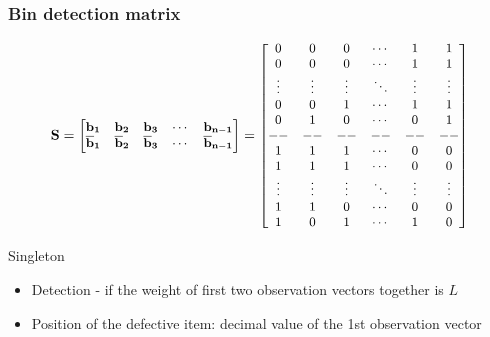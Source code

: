 \begin{frame}\frametitle{Bin detection matrix}
\begin{align*}
{
\small
\mathbf{S}=\begin{bmatrix}
					\bf{b_1} & \bf{b_2} & \bf{b_3} & \cdots & \bf{b_{n-1}}\\
					\vspace{0.2pt}
				   	\bf{\overline{b}_1} & \bf{\overline{b}_2} & \bf{\overline{b}_3} & \cdots & \bf{\overline{b}_{n-1}} \end{bmatrix}
=
 \begin{bmatrix}
		0      & 0   & 0 & \cdots & 1 &  1 \\
		0      & 0   & 0 & \cdots & 1 &  1  \\
		\vdots & \vdots & \vdots & \ddots & \vdots & \vdots \\
		0      & 0   & 1 & \cdots & 1 &  1  \\
		0      & 1   & 0 & \cdots & 0 &  1  \\
		-- & -- & -- & -- & -- & --  \\
        1      & 1   & 1 & \cdots & 0 &  0 \\
		1      & 1   & 1 & \cdots & 0 &  0  \\
		\vdots & \vdots & \vdots & \ddots & \vdots & \vdots \\
		1      & 1   & 0 & \cdots & 0 &  0  \\
		1      & 0   & 1 & \cdots & 1 &  0  \\
\end{bmatrix}
}
\end{align*}

\begin{block}{Singleton}			
\begin{itemize}
\item {\color{blue}Detection} - if the weight of first two observation vectors together is $L$
\item {\color{blue}Position} of the defective item: decimal value of the 1st observation vector
\end{itemize}    				
\end{block}					
\end{frame}

